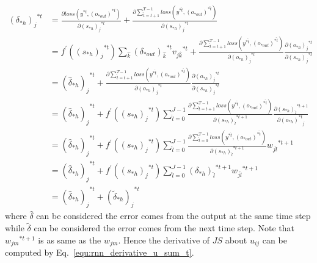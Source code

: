 \documentclass[runningheads,openany]{xhlPaper}
\begin{document}
\begin{equation}
\label{equ:rnn_derivative_delta}
\begin{aligned}
{\left( {{\delta _{*h}}} \right)_j}^{*t} &= \frac{{\partial loss\left( {{y^{*t}},{{\left( {{o_{*out}}} \right)}^{*t}}} \right)}}{{\partial {{\left( {{s_{*h}}} \right)}_j}^{*t}}} + \frac{{\partial \sum\limits_{\hat t = t + 1}^{T - 1} {loss\left( {{y^{*\hat t}},{{\left( {{o_{*out}}} \right)}^{*\hat t}}} \right)} }}{{\partial {{\left( {{s_{*h}}} \right)}_j}^{*t}}}\\
 &= {f^{'}}\left( {{{\left( {{s_{*h}}} \right)}_j}^{*t}} \right)\sum\limits_{\hat k} {{{\left( {{\delta _{*out}}} \right)}_{\hat k}}^{*t}{v_{j\hat k}}^{*t}}  + \frac{{\partial \sum\limits_{\hat t = t + 1}^{T - 1} {loss\left( {{y^{*\hat t}},{{\left( {{o_{*out}}} \right)}^{*\hat t}}} \right)} }}{{\partial {{\left( {{o_{*h}}} \right)}_j}^{*t}}}\frac{{\partial {{\left( {{o_{*h}}} \right)}_j}^{*t}}}{{\partial {{\left( {{s_{*h}}} \right)}_j}^{*t}}}\\
 &= {\left( {{{\hat \delta }_{*h}}} \right)_j}^{*t} + \frac{{\partial \sum\limits_{\hat t = t + 1}^{T - 1} {loss\left( {{y^{*\hat t}},{{\left( {{o_{*out}}} \right)}^{*\hat t}}} \right)} }}{{\partial {{\left( {{o_{*h}}} \right)}_j}^{*t}}}\frac{{\partial {{\left( {{o_{*h}}} \right)}_j}^{*t}}}{{\partial {{\left( {{s_{*h}}} \right)}_j}^{*t}}}\\
 &= {\left( {{{\hat \delta }_{*h}}} \right)_j}^{*t} + {f^{'}}\left( {{{\left( {{s_{*h}}} \right)}_j}^{*t}} \right)\sum\limits_{\hat l = 0}^{J - 1} {\frac{{\partial \sum\limits_{\hat t = t + 1}^{T - 1} {loss\left( {{y^{*\hat t}},{{\left( {{o_{*out}}} \right)}^{*\hat t}}} \right)} }}{{\partial {{\left( {{s_{*h}}} \right)}_{\hat l}}^{*t + 1}}}\frac{{\partial {{\left( {{s_{*h}}} \right)}_{\hat l}}^{*t + 1}}}{{\partial {{\left( {{o_{*h}}} \right)}^{*t}}_j}}} \\
 &= {\left( {{{\hat \delta }_{*h}}} \right)_j}^{*t} + {f^{'}}\left( {{{\left( {{s_{*h}}} \right)}_j}^{*t}} \right)\sum\limits_{\hat l = 0}^{J - 1} {\frac{{\partial \sum\limits_{\hat t = 0}^{T - 1} {loss\left( {{y^{*\hat t}},{{\left( {{o_{*out}}} \right)}^{*\hat t}}} \right)} }}{{\partial {{\left( {{s_{*h}}} \right)}_{\hat l}}^{*t + 1}}}{w_{j\hat l}}^{*t + 1}} \\
 &= {\left( {{{\hat \delta }_{*h}}} \right)_j}^{*t} + {f^{'}}\left( {{{\left( {{s_{*h}}} \right)}_j}^{*t}} \right)\sum\limits_{\hat l = 0}^{J - 1} {{{\left( {{\delta _{*h}}} \right)}_{\hat l}}^{*t + 1}{w_{j\hat l}}^{*t + 1}} \\
 &= {\left( {{{\hat \delta }_{*h}}} \right)_j}^{*t} + {\left( {{{\tilde \delta }_{*h}}} \right)_j}^{*t}
\end{aligned}
\end{equation}
where $\hat \delta$ can be considered the error comes from the output at the same time step while $\tilde \delta$ can be considered the error comes from the next time step.
Note that ${{w_{jm}}^{*t + 1}}$ is as same as the ${{w_{jm}}}$.
Hence the derivative of $JS$ about $u_{ij}$ can be computed by Eq.~\ref{equ:rnn_derivative_u_sum_t}.
\end{document}

